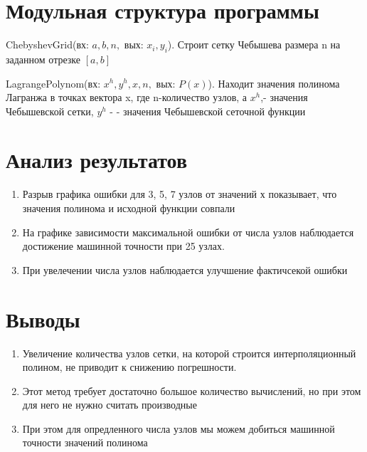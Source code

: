 \documentclass{article}
\begin{document}
	\section{Модульная структура программы}
	ChebyshevGrid(вх: $a, b, n,$ вых: $x_i, y_i$). Строит сетку Чебышева размера n на заданном отрезке $[a, b]$
	
	LagrangePolynom(вх: $x^h, y^h, x, n,$ вых: $P(x)$). Находит значения полинома Лагранжа в точках вектора x, где n-количество узлов, а $x^h$,- значения Чебышевской сетки, $y^h$ - - значения Чебышевской сеточной функции
	
	\section{Анализ результатов}
	\begin{enumerate}
		\item Разрыв графика ошибки для 3, 5, 7 узлов от значений х показывает, что значения полинома и исходной функции совпали
		\item На графике зависимости максимальной ошибки от числа узлов наблюдается достижение машинной точности при 25 узлах.
		\item При увелечении числа узлов наблюдается улучшение фактичсекой ошибки
	\end{enumerate}
	\section{Выводы}
	\begin{enumerate}
	\item Увеличение количества узлов сетки, на которой строится интерполяционный полином, не приводит к снижению погрешности. 
	\item Этот метод требует достаточно большое количество вычислений, но при этом для него не нужно считать производные 
	\item При этом для опредленного числа узлов мы можем добиться машинной точности значений полинома
	\end{enumerate}
	
\end{document}
